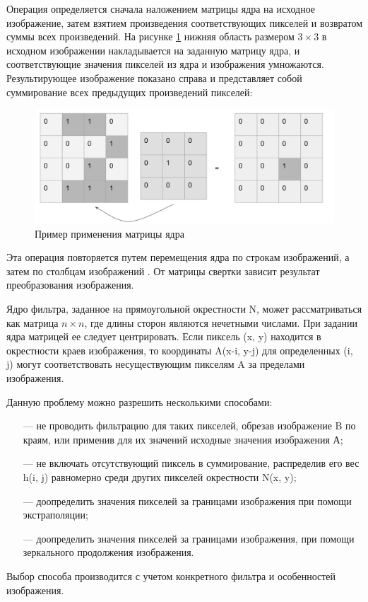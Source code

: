 Операция определяется сначала наложением матрицы ядра на исходное изображение, затем взятием произведения соответствующих пикселей и возвратом суммы всех произведений. На рисунке \ref{fig:spire04} нижняя область размером \(3\times3\) в исходном изображении накладывается на заданную матрицу ядра, и соответствующие значения пикселей из ядра и изображения умножаются. Результирующее изображение показано справа и представляет собой суммирование всех предыдущих произведений пикселей:

\begin{figure}[hbtp]
	\centering
	\includegraphics[width=\textwidth]{img/image4.png}
	\caption{\label{fig:spire04} Пример применения матрицы ядра}
\end{figure}

Эта операция повторяется путем перемещения ядра по строкам изображений, а затем по столбцам изображений \cite{imgProc3}. От матрицы свертки зависит результат преобразования изображения.


Ядро фильтра, заданное на прямоугольной окрестности N, может рассматриваться как матрица \(n\times n\), где длины сторон являются нечетными числами. При задании ядра матрицей ее следует центрировать. Если пиксель (x, y) находится в окрестности краев изображения, то координаты A(x-i, y-j) для определенных (i, j) могут соответствовать несуществующим пикселям A за пределами изображения. 

Данную проблему можно разрешить несколькими способами:
\begin{enumerate}[leftmargin=1.6\parindent]
	\item[---] не проводить фильтрацию для таких пикселей, обрезав изображение B по краям, или применив для их значений исходные значения изображения А;
	\item[---] не включать отсутствующий пиксель в суммирование, распределив его вес h(i, j) равномерно среди других пикселей окрестности N(x, y);
	\item[---] доопределить значения пикселей за границами изображения при помощи экстраполяции;
	\item[---] доопределить значения пикселей за границами изображения, при помощи зеркального продолжения изображения.
\end{enumerate} 
Выбор способа производится с учетом конкретного фильтра и особенностей изображения.

